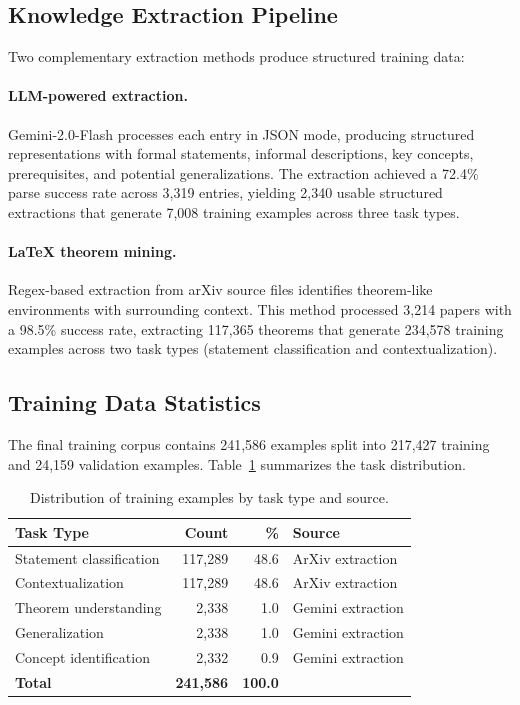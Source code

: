 \documentclass[11pt,a4paper]{article}
\begin{document}
\subsection{Knowledge Extraction Pipeline}

Two complementary extraction methods produce structured training data:

\paragraph{LLM-powered extraction.} Gemini-2.0-Flash processes each entry in JSON mode, producing structured representations with formal statements, informal descriptions, key concepts, prerequisites, and potential generalizations. The extraction achieved a 72.4\% parse success rate across 3,319 entries, yielding 2,340 usable structured extractions that generate 7,008 training examples across three task types.

\paragraph{LaTeX theorem mining.} Regex-based extraction from arXiv source files identifies theorem-like environments with surrounding context. This method processed 3,214 papers with a 98.5\% success rate, extracting 117,365 theorems that generate 234,578 training examples across two task types (statement classification and contextualization).

\subsection{Training Data Statistics}

The final training corpus contains 241,586 examples split into 217,427 training and 24,159 validation examples. Table~\ref{tab:task_distribution} summarizes the task distribution.

\begin{table}[t]
\centering
\caption{Distribution of training examples by task type and source.}
\label{tab:task_distribution}
\small
\begin{tabular}{@{}lrrl@{}}
\toprule
\textbf{Task Type} & \textbf{Count} & \textbf{\%} & \textbf{Source} \\
\midrule
Statement classification & 117,289 & 48.6 & ArXiv extraction \\
Contextualization & 117,289 & 48.6 & ArXiv extraction \\
Theorem understanding & 2,338 & 1.0 & Gemini extraction \\
Generalization & 2,338 & 1.0 & Gemini extraction \\
Concept identification & 2,332 & 0.9 & Gemini extraction \\
\midrule
\textbf{Total} & \textbf{241,586} & \textbf{100.0} & \\
\bottomrule
\end{tabular}
\end{table}
\end{document}

